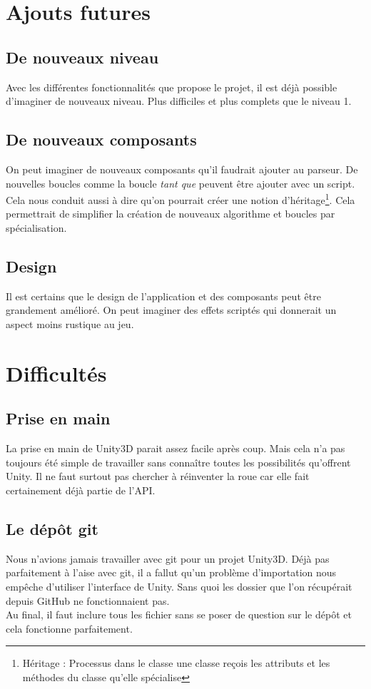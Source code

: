 \documentclass[a4paper,11pt]{myreport}
\begin{document}
\chapter{Ajouts futures}
\section{De nouveaux niveau}
\par Avec les différentes fonctionnalités que propose le projet, il est déjà possible d'imaginer de nouveaux niveau. Plus difficiles et plus complets que le niveau 1.
\section{De nouveaux composants}
\par On peut imaginer de nouveaux composants qu'il faudrait ajouter au parseur. De nouvelles boucles comme la boucle \textit{tant que} peuvent être ajouter avec un script.\\
Cela nous conduit aussi à dire qu'on pourrait créer une notion d'héritage\footnote{Héritage : Processus dans le classe une classe reçois les attributs et les méthodes du classe qu'elle spécialise}. Cela permettrait de simplifier la création de nouveaux algorithme et boucles par spécialisation.
\section{Design}
\par Il est certains que le design de l'application et des composants peut être grandement amélioré. On peut imaginer des effets scriptés qui donnerait un aspect moins rustique au jeu.
\chapter{Difficultés}
\section{Prise en main}
\par La prise en main de Unity3D parait assez facile après coup. Mais cela n'a pas toujours été simple de travailler sans connaître toutes les possibilités qu'offrent Unity. Il ne faut surtout pas chercher à réinventer la roue car elle fait certainement déjà partie de l'API.
\section{Le dépôt git}
\par Nous n'avions jamais travailler avec git pour un projet Unity3D. Déjà pas parfaitement à l'aise avec git, il a fallut qu'un problème d'importation nous empêche d'utiliser l'interface de Unity. Sans quoi les dossier que l'on récupérait depuis GitHub ne fonctionnaient pas.\\
Au final, il faut inclure tous les fichier sans se poser de question sur le dépôt et cela fonctionne parfaitement.
\end{document}
